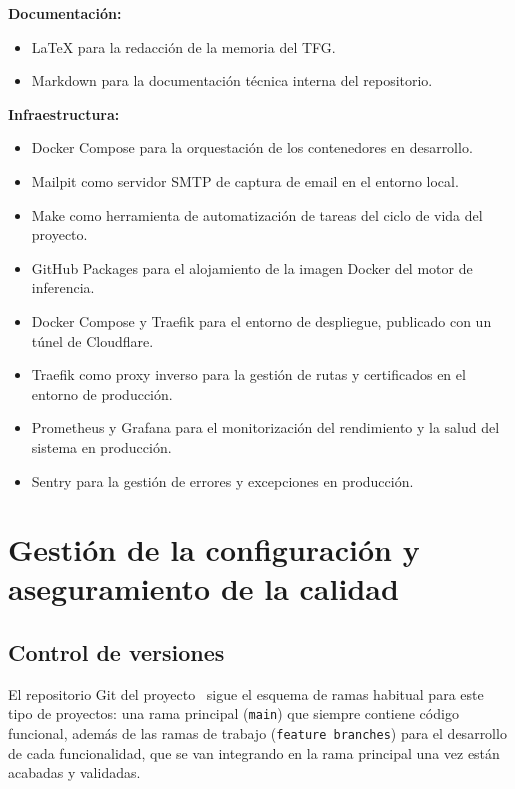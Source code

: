 \textbf{Documentación:}
\begin{itemize}[noitemsep]
 \item \LaTeX{} para la redacción de la memoria del TFG.
 \item Markdown para la documentación técnica interna del repositorio.
\end{itemize}

\textbf{Infraestructura:}
\begin{itemize}[noitemsep]
 \item Docker Compose para la orquestación de los contenedores en desarrollo.
 \item Mailpit como servidor SMTP de captura de email en el entorno local.
 \item Make como herramienta de automatización de tareas del ciclo de vida del proyecto.
 \item GitHub Packages para el alojamiento de la imagen Docker del motor de inferencia.
 \item Docker Compose y Traefik para el entorno de despliegue, publicado con un túnel de Cloudflare.
 \item Traefik como proxy inverso para la gestión de rutas y certificados en el entorno de producción.
 \item Prometheus y Grafana para el monitorización del rendimiento y la salud del sistema en producción.
 \item Sentry para la gestión de errores y excepciones en producción.
\end{itemize}

\section{Gestión de la configuración y aseguramiento de la calidad}

\subsection{Control de versiones}

El repositorio Git del proyecto~\cite{cie10repo2026} sigue el esquema de ramas habitual para este tipo de proyectos: una rama principal (\texttt{main}) que siempre contiene código funcional, además de las ramas de trabajo (\texttt{feature branches}) para el desarrollo de cada funcionalidad, que se van integrando en la rama principal una vez están acabadas y validadas.

